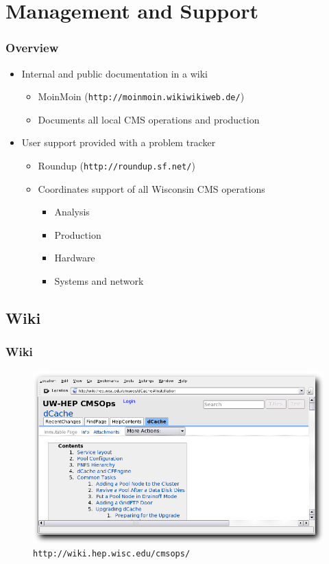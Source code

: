 \documentclass{beamer}
\begin{document}

\section{Management and Support}
\begin{frame}
\frametitle{Overview}
\begin{itemize}
    \item Internal and public documentation in a wiki
    \begin{itemize}
        \item MoinMoin ({\tt http://moinmoin.wikiwikiweb.de/})
        \item Documents all local CMS operations and production
    \end{itemize}
    \item User support provided with a problem tracker
    \begin{itemize}
        \item Roundup ({\tt http://roundup.sf.net/})
        \item Coordinates support of all Wisconsin CMS operations
        \begin{itemize}
            \item Analysis
            \item Production
            \item Hardware
            \item Systems and network
        \end{itemize}
    \end{itemize}
\end{itemize}
\end{frame}

\subsection{Wiki}
\begin{frame}
\frametitle{Wiki}
\begin{figure}
    \includegraphics*{Graphics/wiki.png}
    \caption{{\tt http://wiki.hep.wisc.edu/cmsops/}}
\end{figure}
\end{frame}
\end{document}
